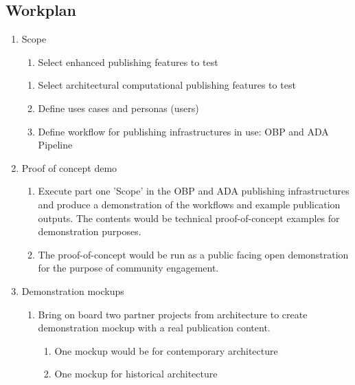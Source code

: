 \documentclass{article}
\begin{document}
\subsection{Workplan}\label{H819867}


\begin{enumerate}
\item Scope

\begin{enumerate}
\item Select enhanced publishing features to test


\end{enumerate}
\begin{enumerate}[start=2]
\item Select architectural computational publishing features to test


\item Define uses cases and personas (users)


\item Define workflow for publishing infrastructures in use: OBP and ADA Pipeline


\end{enumerate}

\item Proof of concept demo

\begin{enumerate}
\item Execute part one 'Scope' in the OBP and ADA publishing infrastructures and produce a demonstration of the workflows and example publication outputs. The contents would be technical proof-of-concept examples for demonstration purposes. 


\item The proof-of-concept would be run as a public facing open demonstration for the purpose of community engagement.


\end{enumerate}

\item Demonstration mockups

\begin{enumerate}
\item Bring on board two partner projects from architecture to create demonstration mockup with a real publication content.

\begin{enumerate}
\item One mockup would be for contemporary architecture


\item One mockup for historical architecture


\end{enumerate}

\end{enumerate}

\end{enumerate}
\end{document}

